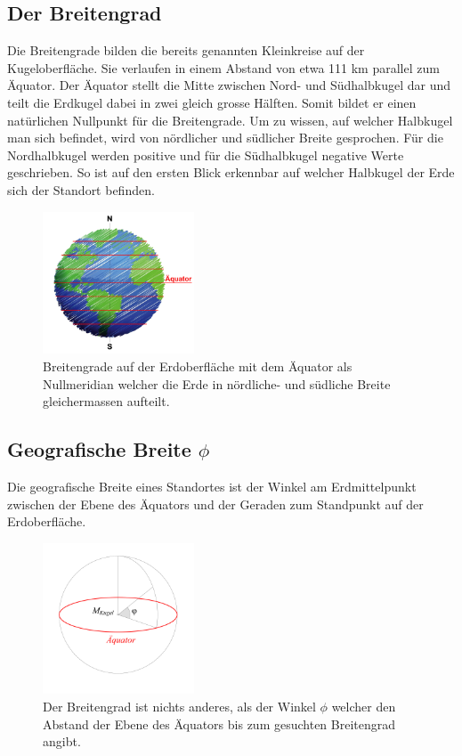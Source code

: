 \begin{refsection}
\section{Der Breitengrad}
Die Breitengrade bilden die bereits genannten Kleinkreise auf der Kugeloberfläche. Sie verlaufen in einem Abstand von etwa 111 km parallel zum Äquator. Der Äquator stellt die Mitte zwischen Nord- und Südhalbkugel dar und teilt die Erdkugel dabei in zwei gleich grosse Hälften. Somit bildet er einen natürlichen Nullpunkt für die Breitengrade.
Um zu wissen, auf welcher Halbkugel man sich befindet, wird von nördlicher und südlicher Breite gesprochen. Für die Nordhalbkugel werden positive und für die Südhalbkugel negative Werte geschrieben. So ist auf den ersten Blick erkennbar auf welcher Halbkugel der Erde sich der Standort befinden.

\begin{figure}[htbp]
\centering
\includegraphics[width=0.4\textwidth]{kugel/BreiteErdkugel.jpg}
\caption{Breitengrade auf der Erdoberfläche mit dem Äquator als Nullmeridian welcher die Erde in nördliche- und südliche Breite gleichermassen aufteilt.}
\end{figure}



\subsection{Geografische Breite $\phi$}
\begin{definition}
Die geografische Breite eines Standortes ist der Winkel am Erdmittelpunkt zwischen der Ebene des Äquators und der Geraden zum Standpunkt auf der Erdoberfläche.
\end{definition}

\begin{figure}[hbtp]
\centering
\includegraphics[width=0.4\textwidth]{kugel/GeografischeBreite.jpg}
\caption{Der Breitengrad ist nichts anderes, als der Winkel $\phi$ welcher den Abstand der Ebene des Äquators bis zum gesuchten Breitengrad angibt.}
\end{figure}


\end{refsection}
